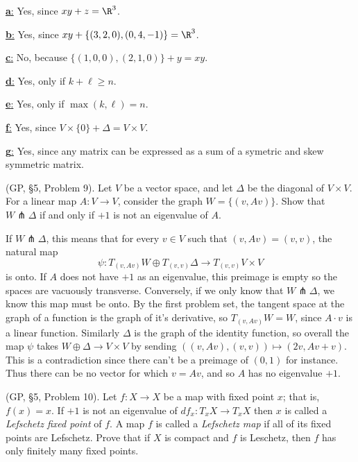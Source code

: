\documentclass[11pt,letterpaper]{article}
\begin{document}
\begin{solution}
    \underline{\textbf{a}:} Yes, since $xy + z = \R^3$. 

    \underline{\textbf{b}:} Yes, since $xy + \{(3,2,0), (0,4,-1)\} = \R^3$.

    \underline{\textbf{c}:} No, because $\{(1,0,0), (2,1,0)\} + y = xy$.

    \underline{\textbf{d}:} Yes, only if $k+\ell \geq n$.

    \underline{\textbf{e}:} Yes, only if $\max(k, \ell) = n$.

    \underline{\textbf{f}:} Yes, since $V\times \{0\} + \Delta = V\times V$.

    \underline{\textbf{g}:} Yes, since any matrix can be expressed as a sum of a symetric and skew symmetric matrix.
\end{solution}

\begin{problem}
    (GP, \S5, Problem 9). Let $V$ be a vector space, and let $\Delta$ be the diagonal of $V\times V$. For a linear map $A: V \to V$, consider the graph $W = \{(v, Av)\}$. Show that $W\pitchfork \Delta$ if and only if $+1$ is not an eigenvalue of $A$.  
\end{problem}

\begin{solution}
    \quad If $W\pitchfork \Delta$, this means that for every $v\in V$ such that $(v,Av) = (v,v)$, the natural map \[\psi: T_{(v,Av)}W\oplus T_{(v,v)}\Delta \to T_{(v,v)}V\times V\] is onto. 
    If $A$ does not have $+1$ as an eigenvalue, this preimage is empty so the spaces are vacuously transverse. Conversely, if we only know that $W\pitchfork \Delta$, we know this map must be onto. By the first problem set, the tangent space at the graph of a function is the graph of it's derivative, so $T_{(v,Av)} W = W$, since $A\cdot v$ is a linear function. Similarly $\Delta$ is the graph of the identity function, so overall the map $\psi$ takes $W\oplus \Delta \to V\times V$ by sending $((v,Av), (v,v)) \mapsto (2v, Av+v)$. This is a contradiction since there can't be a preimage of $(0,1)$ for instance. Thus there can be no vector for which $v=Av$, and so $A$ has no eigenvalue $+1$.  
\end{solution}

\begin{problem}
    (GP, \S5, Problem 10). Let $f : X \to X$ be a map with fixed point $x$; that is, $f(x)=x$. If $+1$ is not an eigenvalue of $df_x : T_xX \to T_xX$ then $x$ is called a \emph{Lefschetz fixed point} of $f$. A map $f$ is called a \emph{Lefschetz map} if all of its fixed points are Lefschetz. Prove that if $X$ is compact and $f$ is Leschetz, then $f$ has only finitely many fixed points.
\end{problem}
\end{document}
